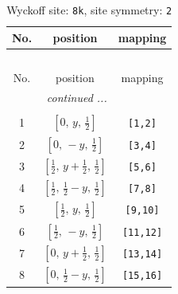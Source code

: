 \documentclass[fleqn,8pt]{jsarticle}
\begin{document}
\begin{longtable}{ccc}
\caption{Wyckoff site: {\tt 8k}, site symmetry: {\tt 2}}
 \\
 \hline \hline
No. & position & mapping \\ \hline \endfirsthead

\multicolumn{2}{l}{\tablename\ \thetable{}} \\
 \hline \hline
No. & position & mapping \\ \hline \endhead

 \hline \hline
\multicolumn{2}{r}{\footnotesize\it continued ...} \\ \endfoot

 \hline \hline
\multicolumn{2}{r}{} \\ \endlastfoot

1 & $\left[ 0,\, y,\, \frac{1}{2} \right]$ & {\tt [1,2]} \\ \hline
2 & $\left[ 0,\, - y,\, \frac{1}{2} \right]$ & {\tt [3,4]} \\ \hline
3 & $\left[ \frac{1}{2},\, y + \frac{1}{2},\, \frac{1}{2} \right]$ & {\tt [5,6]} \\ \hline
4 & $\left[ \frac{1}{2},\, \frac{1}{2} - y,\, \frac{1}{2} \right]$ & {\tt [7,8]} \\ \hline
5 & $\left[ \frac{1}{2},\, y,\, \frac{1}{2} \right]$ & {\tt [9,10]} \\ \hline
6 & $\left[ \frac{1}{2},\, - y,\, \frac{1}{2} \right]$ & {\tt [11,12]} \\ \hline
7 & $\left[ 0,\, y + \frac{1}{2},\, \frac{1}{2} \right]$ & {\tt [13,14]} \\ \hline
8 & $\left[ 0,\, \frac{1}{2} - y,\, \frac{1}{2} \right]$ & {\tt [15,16]} \\
\end{longtable}
\renewcommand{\arraystretch}{1.2}
\end{document}

